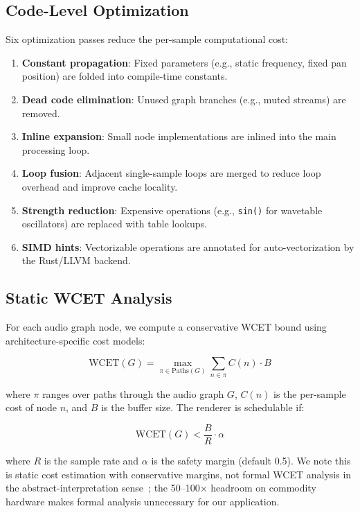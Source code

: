 \documentclass[sigchi, nonacm]{acmart}
\begin{document}
\subsection{Code-Level Optimization}

Six optimization passes reduce the per-sample computational cost:

\begin{enumerate}
    \item \textbf{Constant propagation}: Fixed parameters (e.g., static frequency, fixed pan position) are folded into compile-time constants.
    \item \textbf{Dead code elimination}: Unused graph branches (e.g., muted streams) are removed.
    \item \textbf{Inline expansion}: Small node implementations are inlined into the main processing loop.
    \item \textbf{Loop fusion}: Adjacent single-sample loops are merged to reduce loop overhead and improve cache locality.
    \item \textbf{Strength reduction}: Expensive operations (e.g., \texttt{sin()} for wavetable oscillators) are replaced with table lookups.
    \item \textbf{SIMD hints}: Vectorizable operations are annotated for auto-vectorization by the Rust/LLVM backend.
\end{enumerate}

\subsection{Static WCET Analysis}

For each audio graph node, we compute a conservative WCET bound using architecture-specific cost models:

\begin{equation}
\mathrm{WCET}(G) = \max_{\pi \in \mathrm{Paths}(G)} \sum_{n \in \pi} C(n) \cdot B
\end{equation}

where $\pi$ ranges over paths through the audio graph $G$, $C(n)$ is the per-sample cost of node $n$, and $B$ is the buffer size. The renderer is schedulable if:

\begin{equation}
\mathrm{WCET}(G) < \frac{B}{R} \cdot \alpha
\end{equation}

where $R$ is the sample rate and $\alpha$ is the safety margin (default 0.5). We note this is static cost estimation with conservative margins, not formal WCET analysis in the abstract-interpretation sense~\cite{wilhelm2008worst}; the 50--100$\times$ headroom on commodity hardware makes formal analysis unnecessary for our application.
\end{document}
